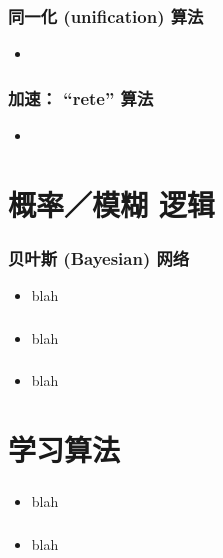 \documentclass[17pt]{beamer}
\begin{document}
\begin{frame}
\frametitle{同一化 (unification) 算法}
\begin{itemize}
	\item 
\end{itemize}
\end{frame}

\begin{frame}
\frametitle{加速： ``rete'' 算法}
\begin{itemize}
	\item 
\end{itemize}
\end{frame}


\section[Section]{概率／模糊 逻辑}
\frame{\sectionpage}

\begin{frame}
\frametitle{贝叶斯 (Bayesian) 网络}
\begin{itemize}
	\item blah
\end{itemize}
\end{frame}

\begin{frame}
\frametitle{}
\begin{itemize}
	\item blah
\end{itemize}
\end{frame}

\begin{frame}
\frametitle{}
\begin{itemize}
	\item blah
\end{itemize}
\end{frame}

\section[Section]{学习算法}
\frame{\sectionpage}

\begin{frame}
\frametitle{}
\begin{itemize}
	\item blah
\end{itemize}
\end{frame}

\begin{frame}
\frametitle{}
\begin{itemize}
	\item blah
\end{itemize}
\end{frame}
\end{document}
